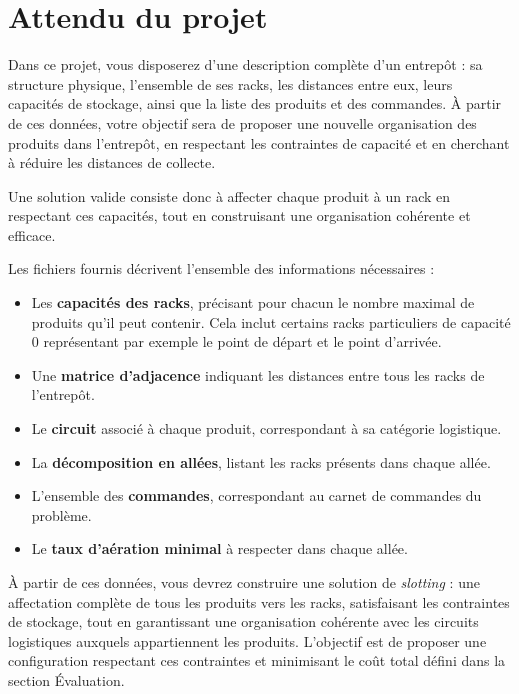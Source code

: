 \documentclass{article}
\begin{document}
\section{Attendu du projet}

Dans ce projet, vous disposerez d’une description complète d’un entrepôt : sa structure physique, l’ensemble de ses racks, les distances entre eux, leurs capacités de stockage, ainsi que la liste des produits et des commandes. À partir de ces données, votre objectif sera de proposer une nouvelle organisation des produits dans l’entrepôt, en respectant les contraintes de capacité et en cherchant à réduire les distances de collecte. 

Une solution valide consiste donc à affecter chaque produit à un rack en respectant ces capacités, tout en construisant une organisation cohérente et efficace.


\vspace{0.4cm}

Les fichiers fournis décrivent l’ensemble des informations nécessaires :

\begin{itemize}
    \item Les \textbf{capacités des racks}, précisant pour chacun le nombre maximal de produits qu'il peut contenir. Cela inclut certains racks particuliers de capacité 0 représentant par exemple le point de départ et le point d'arrivée.
    \item Une \textbf{matrice d'adjacence} indiquant les distances entre tous les racks de l'entrepôt.
    \item Le \textbf{circuit} associé à chaque produit, correspondant à sa catégorie logistique.
    \item La \textbf{décomposition en allées}, listant les racks présents dans chaque allée.
    \item L'ensemble des \textbf{commandes}, correspondant au carnet de commandes du problème.
    \item Le \textbf{taux d'aération minimal} à respecter dans chaque allée.
\end{itemize}
\vspace{0.4cm}


À partir de ces données, vous devrez construire une solution de \textit{slotting} : une affectation complète de tous les produits vers les racks, satisfaisant les contraintes de stockage, tout en garantissant une organisation cohérente avec les circuits logistiques auxquels appartiennent les produits. L’objectif est de proposer une configuration respectant ces contraintes et minimisant le coût total défini dans la section Évaluation.
\end{document}
